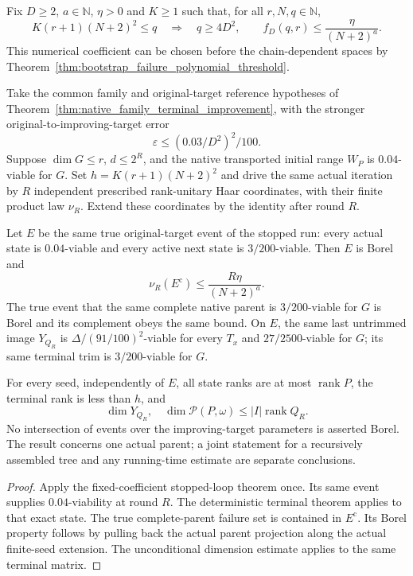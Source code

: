 \begin{theorem}
    \label{thm:canonical_half_sampling_parent_probability}
    \leanok
    Fix $D\ge2$, $a\in\mathbb N$, $\eta>0$ and $K\ge1$ such that, for
    all $r,N,q\in\mathbb N$,
    \[
        K(r+1)(N+2)^2\le q
        \quad\Longrightarrow\quad
        q\ge4D^2,\qquad f_D(q,r)\le\frac{\eta}{(N+2)^a}.
    \]
    This numerical coefficient can be chosen before the chain-dependent
    spaces by Theorem~\ref{thm:bootstrap_failure_polynomial_threshold}.

    Take the common family and original-target reference hypotheses of
    Theorem~\ref{thm:native_family_terminal_improvement}, with the stronger
    original-to-improving-target error
    \[
        \varepsilon\le(0.03/D^2)^2/100.
    \]
    Suppose $\dim G\le r$, $d\le2^R$, and the native transported initial
    range $W_P$ is $0.04$-viable for $G$. Set
    $h=K(r+1)(N+2)^2$ and drive the same actual iteration by $R$ independent
    prescribed rank-unitary Haar coordinates, with their finite product
    law $\nu_R$. Extend these coordinates by the identity after round $R$.

    Let $E$ be the same true original-target event of the stopped run:
    every actual state is $0.04$-viable and every active next state is
    $3/200$-viable. Then $E$ is Borel and
    \[
        \nu_R(E^{\mathrm c})\le\frac{R\eta}{(N+2)^a}.
    \]
    The true event that the same complete native parent is $3/200$-viable
    for $G$ is Borel and its complement obeys the same bound.
    On $E$, the same last untrimmed image $Y_{Q_R}$ is
    $\Delta/(91/100)^2$-viable for every $T_x$ and $27/2500$-viable for $G$;
    its same terminal trim is $3/200$-viable for $G$.

    For every seed, independently of $E$, all state ranks are at most
    $\operatorname{rank}P$, the terminal rank is less than $h$, and
    \[
        \dim Y_{Q_R},\quad\dim\mathcal P(P,\omega)
        \le |I|\operatorname{rank}Q_R.
    \]
    No intersection of events over the improving-target parameters is
    asserted Borel. The result concerns one actual parent; a joint statement
    for a recursively assembled tree and any running-time estimate are
    separate conclusions.
\end{theorem}
\begin{proof}\leanok
    Apply the fixed-coefficient stopped-loop theorem once. Its same event
    supplies $0.04$-viability at round $R$. The deterministic terminal
    theorem applies to that exact state. The true complete-parent failure
    set is contained in $E^{\mathrm c}$. Its Borel property follows by
    pulling back the actual parent projection along the actual finite-seed
    extension. The unconditional dimension estimate applies to the same
    terminal matrix.
\end{proof}
